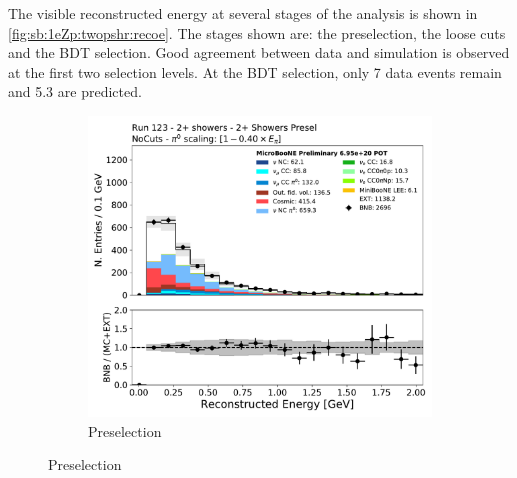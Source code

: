 The visible reconstructed energy at several stages of the analysis is shown in \cref{fig:sb:1eZp:twopshr:recoe}. The stages shown are: the \zpsel preselection, the \zpsel loose cuts and the \zpsel BDT selection. Good agreement between data and simulation is observed at the first two selection levels. At the BDT selection, only 7 data events remain and 5.3 are predicted.

\begin{figure}[H]
    \begin{center}
    \begin{subfigure}{0.45\textwidth}
    \centering
    \includegraphics[width=1.00\textwidth]{Sidebands/Figures/TwoShr_1e0pSel_newSamples/reco_e_presel.pdf}
    \caption{\zpsel Preselection}
    \end{subfigure}
    

\end{center}
\end{figure}
